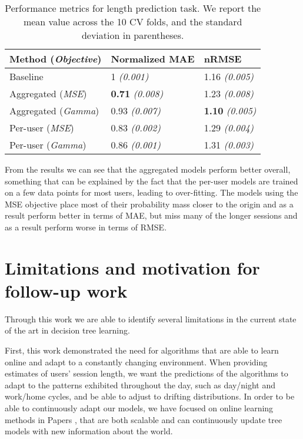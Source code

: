 \begin{table}
	\centering
	\caption{Performance metrics for length prediction task. We report the
		mean value across the 10 CV folds, and the standard deviation in parentheses.}
	\label{tab:session-length-prediction}
	\begin{tabular}{lll}
		\toprule
		Method (\textit{Objective}) & Normalized MAE & nRMSE \\
		\midrule
		Baseline & 1 \textit{(0.001)} & 1.16 \textit{(0.005)} \\
		Aggregated (\textit{MSE}) & \textbf{0.71} \textit{(0.008)} & 1.23 \textit{(0.008)} \\
		Aggregated (\textit{Gamma}) & 0.93 \textit{(0.007)} & \textbf{1.10} \textit{(0.005)} \\
		Per-user (\textit{MSE}) & 0.83 \textit{(0.002)} & 1.29 \textit{(0.004)} \\
		Per-user (\textit{Gamma}) & 0.86 \textit{(0.001)} & 1.31 \textit{(0.003)} \\
		\bottomrule
	\end{tabular}
\end{table}

From the results we can see that the aggregated models perform better overall,
something that can be explained by the fact that the per-user models are trained
on a few data points for most users, leading to over-fitting. The models using the
MSE objective place most of their probability mass closer to the origin and as a
result perform better in terms of MAE, but miss many of the longer sessions
and as a result perform worse in terms of RMSE.

\section{Limitations and motivation for follow-up work}
\label{sec:session-length-limitations}

Through this work we are able to identify several limitations in the current
state of the art in decision tree learning.

First, this work demonstrated the need for algorithms that are
able to learn online and adapt to a constantly changing environment. When
providing estimates of users' session length, we want the predictions of
the algorithms to adapt to the patterns exhibited throughout the day, 
such as day/night and work/home cycles, and be able to adjust to drifting
distributions. 
In order to be able to continuously adapt our models, we have focused on online learning
methods in Papers \boostvhtNum, \uncertaintreesNum that are both scalable and can continuously update tree models with new information about the world.

